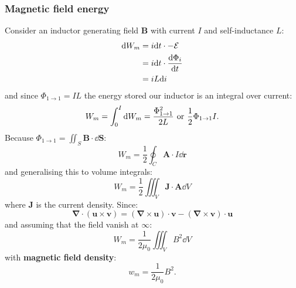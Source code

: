 \documentclass{article}
\newcommand{\vc}[1]{\boldsymbol{#1}}
\begin{document}
\begin{multicols*}{3}
\subsubsection*{Magnetic field energy}
Consider an inductor generating field $\vc{B}$
with current $I$ and self-inductance $L$:
\begin{align*}
    \dd W_m
    &=i\dd t\cdot -\mathcal{E} \\
    &=i\dd t\cdot\dv{\Phi_i}{t} \\
    &=iL\dd i
\end{align*}
and since $\Phi_{1\rightarrow1}=IL$
the energy stored our inductor is an integral over current:
$$W_m=\int_{0}^{I}\dd W_m=\frac{\Phi_{1\rightarrow1}^2}{2L}
\hspace{0.05in}\text{or}\hspace{0.05in}
\frac{1}{2}\Phi_{1\rightarrow1} I.$$
Because
$\displaystyle\Phi_{1\rightarrow1}=\iint_S\vc{B}\cdot\dd\vc{S}$:
$$W_m=\frac{1}{2}\oint_C\vc{A}\cdot I\dd\vc{r}$$
and generalising this to volume integrals:
$$W_m=\frac{1}{2}\iiint_V\vc{J}\cdot\vc{A}\dd V$$
where $\vc{J}$ is the current density. Since:
$$\vc{\nabla}\cdot(\vc{u}\times\vc{v})
=(\vc{\nabla}\times\vc{u})\cdot\vc{v}
-(\vc{\nabla}\times\vc{v})\cdot\vc{u}$$
and assuming that the field vanish at $\infty$:
$$W_m=\frac{1}{2\mu_0}\iiint_V B^2\dd V$$
with \textbf{magnetic field density}:
$$w_m=\frac{1}{2\mu_0}B^2.$$
\end{multicols*}
\end{document}
